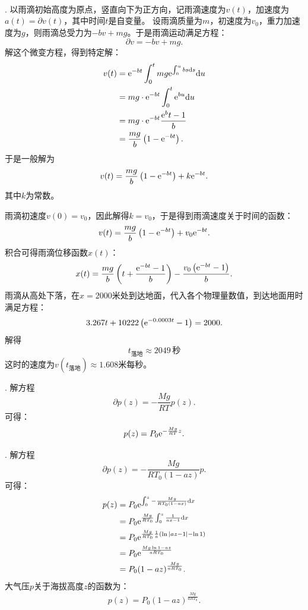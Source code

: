 \documentclass[12pt,UTF8,fontset=none]{ctexbook}
\begin{document}
\begin{so}
    \mbox{} \\
    . 以雨滴初始高度为原点，竖直向下为正方向，记雨滴速度为$v(t)$，加速度为$a(t) = \partial v (t)$，其中时间$t$是自变量。
    设雨滴质量为$m$，初速度为$v_0$，重力加速度为$g$，则雨滴总受力为$- bv + mg$。于是雨滴运动满足方程：
    $$ \partial v = - bv + mg.$$
    解这个微变方程，得到特定解：
    \begin{align*}
        v(t) &= \mathrm{e}^{-bt} \int_0^t mg \mathrm{e}^{\int_0^u bs\mathrm{d}s} \mathrm{d}u\\
        &= mg \cdot \mathrm{e}^{-bt} \int_0^t \mathrm{e}^{bu}\mathrm{d}u \\
        &= mg \cdot \mathrm{e}^{-bt} \frac{\mathrm{e}^bt - 1}{b} \\
        &= \frac{mg}{b}\left(1 - \mathrm{e}^{-bt}\right).
    \end{align*}
    于是一般解为
    $$ v(t) = \frac{mg}{b}\left(1 - \mathrm{e}^{-bt}\right) + k\mathrm{e}^{-bt}. $$
    其中$k$为常数。
    
    雨滴初速度$v(0) = v_0$，因此解得$k = v_0$，于是得到雨滴速度关于时间的函数：
    $$ v(t) = \frac{mg}{b}\left(1 - \mathrm{e}^{-bt}\right) + v_0\mathrm{e}^{-bt}. $$
    积合可得雨滴位移函数$x(t)$：
    $$ x(t) = \frac{mg}{b}\left(t + \frac{\mathrm{e}^{-bt} - 1}{b}\right) - \frac{v_0\left(\mathrm{e}^{-bt} - 1\right)}{b}. $$
    雨滴从高处下落，在$x=2000$米处到达地面，代入各个物理量数值，到达地面用时满足方程：
    $$ 3.267t + 10222 \left(\mathrm{e}^{-0.0003t} - 1\right) = 2000.  $$
    解得
    $$ t_{\text{落地}} \approx 2049\,\mbox{秒} $$
    这时的速度为$v(t_{\text{落地}}) \approx 1.608$米每秒。

    . 解方程
    $$ \partial p(z) = -\frac{Mg}{RT} p(z). $$
    可得：
    $$ p(z) = P_0\mathrm{e}^{-\frac{Mg}{RT}z}.$$

    . 解方程
    $$ \partial p(z) = -\frac{Mg}{RT_0(1 - az)} p. $$
    可得：
    \begin{align*}
        p(z) &= P_0\mathrm{e}^{\int_0^z -\frac{Mg}{RT_0(1 - ax)}\mathrm{d}x} \\
        &= P_0\mathrm{e}^{\frac{Mg}{RT_0}\int_0^z \frac{1}{ax - 1}\mathrm{d}x} \\
        &= P_0\mathrm{e}^{\frac{Mg}{RT_0}\frac{1}{a}\left(\ln{|az - 1|} - \ln{1}\right)} \\
        &= P_0\mathrm{e}^{\frac{Mg\ln{1 - az}}{aRT_0}} \\
        &= P_0 (1 - az)^{\frac{Mg}{aRT_0}}.
    \end{align*}
    大气压$p$关于海拔高度$z$的函数为：
    $$ p(z) = P_0 (1 - az)^{\frac{Mg}{aRT_0}}.$$


\end{so}
\end{document}
